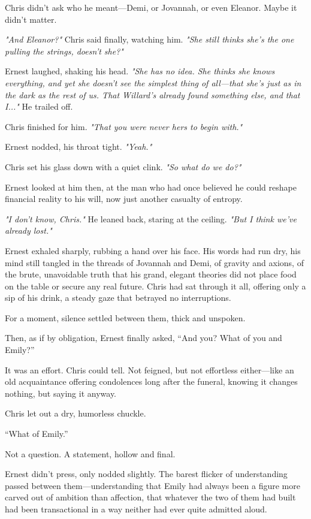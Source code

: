 Chris didn’t ask who he meant—Demi, or Jovannah, or even Eleanor. Maybe it didn’t matter.

\textit{"And Eleanor?"} Chris said finally, watching him. \textit{"She still thinks she’s the one pulling the strings, doesn’t she?"}

Ernest laughed, shaking his head. \textit{"She has no idea. She thinks she knows everything, and yet she doesn’t see the simplest thing of all—that she’s just as in the dark as the rest of us. That Willard’s already found something else, and that I..."} He trailed off.

Chris finished for him. \textit{"That you were never hers to begin with."}

Ernest nodded, his throat tight. \textit{"Yeah."}

Chris set his glass down with a quiet clink. \textit{"So what do we do?"}

Ernest looked at him then, at the man who had once believed he could reshape financial reality to his will, now just another casualty of entropy.

\textit{"I don't know, Chris."} He leaned back, staring at the ceiling. \textit{"But I think we’ve already lost."}

Ernest exhaled sharply, rubbing a hand over his face. His words had run dry, his mind still tangled in the threads of Jovannah and Demi, of gravity and axions, of the brute, unavoidable truth that his grand, elegant theories did not place food on the table or secure any real future. Chris had sat through it all, offering only a sip of his drink, a steady gaze that betrayed no interruptions.  

For a moment, silence settled between them, thick and unspoken.  

Then, as if by obligation, Ernest finally asked, “And you? What of you and Emily?”  

It was an effort. Chris could tell. Not feigned, but not effortless either—like an old acquaintance offering condolences long after the funeral, knowing it changes nothing, but saying it anyway.  

Chris let out a dry, humorless chuckle.  

“What of Emily.”  

Not a question. A statement, hollow and final.  

Ernest didn’t press, only nodded slightly. The barest flicker of understanding passed between them—understanding that Emily had always been a figure more carved out of ambition than affection, that whatever the two of them had built had been transactional in a way neither had ever quite admitted aloud.  

